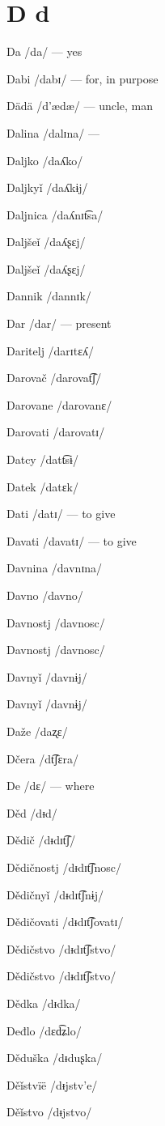 \chapter{D d}

Da /da/ — yes

Dabi /dabɪ/ — for, in purpose

Dädä /d’ædæ/ — uncle, man

Dalina /dalɪna/ —

Daljko /daʎko/

Daljkyǐ /daʎkɨj/

Daljnica /daʎnɪt͡sa/

Daljšeǐ /daʎʂɛj/

Daljšeǐ /daʎʂɛj/

Dannik /dannɪk/

Dar /dar/ — present

Daritelj /darɪtɛʎ/

Darovač /darovat͡ʃ/

Darovane /darovanɛ/

Darovati /darovatɪ/

Datcy /datt͡sɨ/

Datek /datɛk/

Dati /datɪ/ — to give

Davati /davatɪ/ — to give

Davnina /davnɪna/

Davno /davno/

Davnostj /davnosc/

Davnostj /davnosc/

Davnyǐ /davnɨj/

Davnyǐ /davnɨj/

Daže /daʐɛ/

Dčera /dt͡ʃɛra/

De /dɛ/ — where

Děd /dᵻd/

Dědič /dᵻdɪt͡ʃ/

Dědičnostj /dᵻdɪt͡ʃnosc/

Dědičnyǐ /dᵻdɪt͡ʃnɨj/

Dědičovati /dᵻdɪt͡ʃovatɪ/

Dědičstvo /dᵻdɪt͡ʃstvo/

Dědičstvo /dᵻdɪt͡ʃstvo/

Dědka /dᵻdka/

Deđlo /dɛd͡ʑlo/

Děduška /dᵻduʂka/

Děǐstvïë /dᵻjstv’e/

Děǐstvo /dᵻjstvo/

